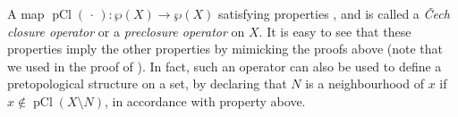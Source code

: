 \documentclass[article, a4paper, 11pt, oneside]{memoir}
\numberwithin{equation}{chapter}
\renewcommand{\powerset}[1]{\wp(#1)}
\newcommand{\pCl}[1]{\operatorname{pCl}(#1)}
\begin{document}
\begin{remark}
    \label{rem:Cech-closure-operator}
    A map $\pCl{\,\cdot\,} \colon \powerset{X} \to \powerset{X}$ satisfying properties ,  and  is called a \emph{\v{C}ech closure operator} or a \emph{preclosure operator} on $X$. It is easy to see that these properties imply the other properties by mimicking the proofs above (note that we used  in the proof of ). In fact, such an operator can also be used to define a pretopological structure on a set, by declaring that $N$ is a neighbourhood of $x$ if $x \not\in \pCl{X \setminus N}$, in accordance with property  above.
\end{remark}
\end{document}
